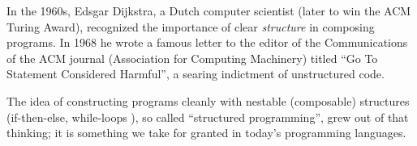 In the 1960s, Edsgar Dijkstra, a Dutch computer scientist (later to
win the ACM Turing Award), recognized the importance of clear
\emph{structure} in composing programs.  In 1968 he wrote a famous
letter to the editor of the Communications of the ACM journal
(Association for Computing Machinery) titled ``Go To Statement
Considered Harmful'', a searing indictment of unstructured code.

The idea of constructing programs cleanly with nestable (composable)
structures (if-then-else, while-loops {\etc}), so called ``structured
programming'', grew out of that thinking; it is something we take for
granted in today's programming languages.

